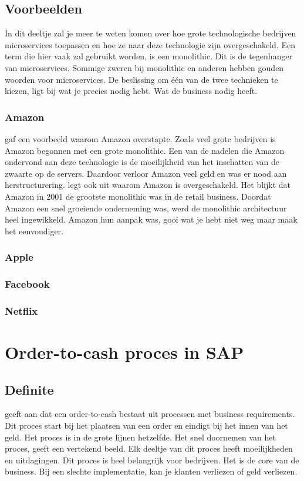 \subsection{Voorbeelden}
In dit deeltje zal je meer te weten komen over hoe grote technologische bedrijven microservices toepassen en hoe ze naar deze technologie zijn overgeschakeld.
Een term die hier vaak zal gebruikt worden, is een monolithic. Dit is de tegenhanger van microservices. Sommige zweren bij monolithic en anderen hebben gouden woorden voor microservices. De beslissing om één van de twee technieken te kiezen, ligt bij wat je precies nodig hebt. Wat de business nodig heeft. 

\subsubsection{Amazon}
\textcite{Mauersberger2017} gaf een voorbeeld waarom Amazon overstapte. Zoals veel grote bedrijven is Amazon begonnen met een grote monolithic. Een van de nadelen die Amazon ondervond aan deze technologie is de moeilijkheid van het inschatten van de zwaarte op de servers. Daardoor verloor Amazon veel geld en was er nood aan herstructurering.
\textcite{Fulton2015} legt ook uit waarom Amazon is overgeschakeld. Het blijkt dat Amazon in 2001 de grootste monolithic was in de retail business. Doordat Amazon een snel groeiende onderneming was, werd de monolithic architectuur heel ingewikkeld. Amazon hun aanpak was, gooi wat je hebt niet weg maar maak het eenvoudiger. 
\subsubsection{Apple}
\subsubsection{Facebook}
\subsubsection{Netflix}

\section{Order-to-cash proces in SAP}
\subsection{Definite}
\textcite{Obrien2017} geeft aan dat een order-to-cash bestaat uit processen met business requirements. Dit proces start bij het plaatsen van een order en eindigt bij het innen van het geld. Het proces is in de grote lijnen hetzelfde. Het snel doornemen van het proces, geeft een vertekend beeld. Elk deeltje van dit proces heeft moeilijkheden en uitdagingen. 
Dit proces is heel belangrijk voor bedrijven. Het is de core van de business. Bij een slechte implementatie, kan je klanten verliezen of geld verliezen. 
